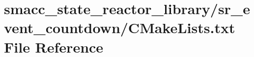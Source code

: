 \hypertarget{state__reactor__library_2sr__event__countdown_2CMakeLists_8txt}{}\section{smacc\+\_\+state\+\_\+reactor\+\_\+library/sr\+\_\+event\+\_\+countdown/\+C\+Make\+Lists.txt File Reference}
\label{state__reactor__library_2sr__event__countdown_2CMakeLists_8txt}
